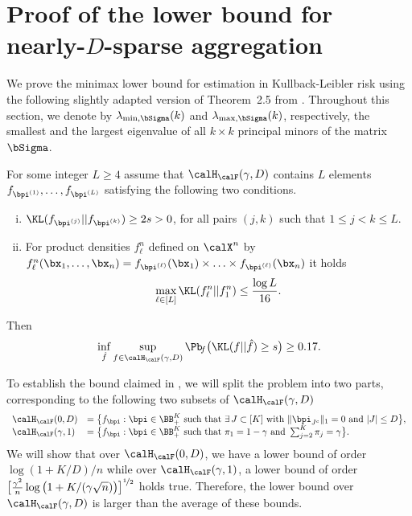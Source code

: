 \section{Proof of the lower bound for nearly-$D$-sparse aggregation}\label{sec:proof-lower}
We prove the minimax lower bound for estimation in Kullback-Leibler risk using 
the following slightly adapted version of Theorem~2.5 from \cite{tsybakov2009Nonparametric}. 
Throughout this section, we denote by $\lambda_{\min,\bSigma}(k)$ and $\lambda_{\max,\bSigma}(k)$,
respectively, the smallest and the largest eigenvalue of all $k\times k$ principal minors of 
the matrix $\bSigma$.
\begin{theorem}%
\label{tsy_main_theo_nonparam_est}
For some integer $L\ge 4$ assume that
$\calH_\calF(\gamma,D)$ contains $L$ elements $f_{\bpi^{(1)}},\dots,f_{\bpi^{(L)}}$
satisfying the following two conditions.
\vspace{-10pt}
\begin{enumerate}[(i)]
\item $\KL(f_{\bpi^{(j)}}||f_{\bpi^{(k)}})\geq2s>0$,  for all pairs $(j,k)$ such that $1\leq j<k\leq L$.
\item For product densities $f_{\ell}^n$ defined on $\calX^n$ by $f_{\ell}^n(\bx_1,\ldots,\bx_n) =
f_{\bpi^{(\ell)}}(\bx_1)\times\ldots\times f_{\bpi^{(\ell)}}(\bx_n)$ it holds 
\begin{equation}
  \max_{\ell\in[L]} \KL(f_{\ell}^n||f_1^n) \leq \frac{\log L}{16}.
\end{equation}
\end{enumerate}
\vspace{-10pt}
Then
\begin{equation}
\inf_{\hat f}\sup_{f \in \calH_\calF(\gamma,D)}\Pb\!_{f}\big(\KL(f||\hat f)\geq s\big)\geq 0.17.
\end{equation}
\end{theorem}
To establish the bound claimed in , we will split the problem into two parts,
corresponding to the following two subsets of $\calH_\calF(\gamma,D)$
\begin{equation}
\begin{array}{ll}
\calH_\calF(0,D) &= \big\{f_{\bpi} : \bpi\in\BB^K_+ \text{ such that }\exists \, J\subset [K]
\text{ with } \|\bpi_{J^c}\|_1 = 0 \text{ and } |J|\le D\big\}, \\
\calH_\calF(\gamma,1) &= \big\{f_{\bpi} : \bpi\in\BB^K_+ \text{ such that } \pi_1 = 1-\gamma \text{ and } \sum_{j=2}^K\pi_j = \gamma \big\}.
\end{array}
\end{equation}
We will show that over $\calH_\calF(0,D)$, we have a lower bound of order $\log(1+K/D)/n$ while over 
$\calH_\calF(\gamma,1)$, a lower bound of order 
$\big[\frac{\gamma^2}{n}\log\big(1+K/(\gamma\sqrt{n})\big)\big]^{\nicefrac12}$ holds true. Therefore, 
the lower bound  over $\calH_\calF(\gamma,D)$ is larger than the average of these bounds.

